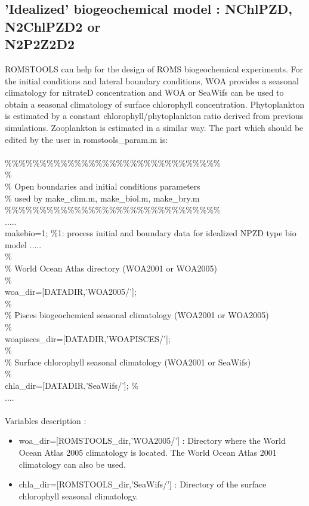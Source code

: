 \subsection{'Idealized' biogeochemical model : NChlPZD, N2ChlPZD2 or \\ 
N2P2Z2D2}
ROMSTOOLS can help for the design of ROMS biogeochemical
experiments. For the initial conditions and lateral boundary
conditions, WOA provides a seasonal climatology for nitrateD
concentration and WOA or SeaWifs can be used to obtain a 
seasonal climatology of surface chlorophyll concentration.
Phytoplankton is estimated by a constant chlorophyll/phytoplankton 
ratio derived from previous simulations. Zooplankton is estimated
in a similar way. The part which should be edited by the user in 
romstools\_param.m is:\\
\\ 
\%\%\%\%\%\%\%\%\%\%\%\%\%\%\%\%\%\%\%\%\%\%\%\%\%\%\%\%\%\%\%\\
\%\\
\% Open boundaries and initial conditions parameters\\
\%   used by make\_clim.m, make\_biol.m, make\_bry.m\\
\%\%\%\%\%\%\%\%\%\%\%\%\%\%\%\%\%\%\%\%\%\%\%\%\%\%\%\%\%\%\%\\
..... \\
makebio=1;    \%1: process initial and boundary data for idealized NPZD type bio model
..... \\
\noindent \% \\
\% World Ocean Atlas directory (WOA2001 or WOA2005)  \\
\% \\
woa\_dir=[DATADIR,'WOA2005/'];  \\
\% \\
\% Pisces biogeochemical seasonal climatology (WOA2001 or WOA2005)  \\
\% \\
woapisces\_dir=[DATADIR,'WOAPISCES/']; \\
\%\\
\% Surface chlorophyll seasonal climatology (WOA2001 or SeaWifs) \\
\%\\
chla\_dir=[DATADIR,'SeaWifs/'];
\% \\
.... \\ \\
Variables description :
\begin{itemize}
\item woa\_dir=[ROMSTOOLS\_dir,'WOA2005/'] : Directory where the World Ocean
Atlas 2005 climatology \citep{Con02} is located. The World Ocean
Atlas 2001 climatology can also be used.
\item chla\_dir=[ROMSTOOLS\_dir,'SeaWifs/'] : Directory of the surface 
chlorophyll seasonal climatology.
\end{itemize}


